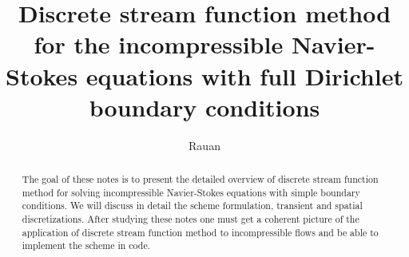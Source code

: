 \documentclass{article}
\title{Discrete stream function method for the incompressible Navier-Stokes equations with full Dirichlet boundary conditions}
\author{Rauan}
\numberwithin{equation}{section}
\begin{document}
\maketitle

\begin{abstract}
The goal of these notes is to present the detailed overview of discrete stream function method for solving incompressible Navier-Stokes equations with simple boundary conditions. We will discuss in detail the scheme formulation, transient and spatial discretizations.  After studying these notes one must get a coherent picture of the application of discrete stream function method to incompressible flows and be able to implement the scheme in code.
\end{abstract}

\tableofcontents
\end{document}
